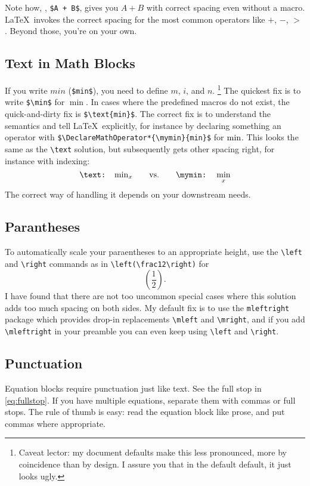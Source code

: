 Note how, \eg, \verb|$A + B$|, gives you $A+B$ with correct spacing even without a macro.
\LaTeX\ invokes the correct spacing for the most common operators like $+$, $-$, $>$ \etc.
Beyond those, you're on your own.

\subsection{Text in Math Blocks}
If you write $min$ (\verb|$min$|), you need to define $m$, $i$, and $n$.%
\footnote{
	Caveat lector: my document defaults make this less pronounced, more by coincidence than by design.
	I assure you that in the default default, it just looks ugly.
}
The quickest fix is to write \verb|$\min$| for $\min$.
In cases where the predefined macros do not exist, the quick-and-dirty fix is \verb|$\text{min}$|.
The correct fix is to understand the semantics and tell \LaTeX\ explicitly, for instance by declaring something an operator with \verb|$\DeclareMathOperator*{\mymin}{min}$| for $\mymin$.
This looks the same as the \verb|\text| solution, but subsequently gets other spacing right, for instance with indexing:
\begin{equation}
	\texttt{\textbackslash text: }\text{min}_x\qquad\text{\vs}\qquad\texttt{\textbackslash mymin: } \mymin_x
\end{equation}
The correct way of handling it depends on your downstream needs.

\subsection{Parantheses}
To automatically scale your paraentheses to an appropriate height, use the \verb|\left| and \verb|\right| commands as in
\verb|\left(\frac12\right)| for
\begin{equation}\label{eq:fullstop}
	\left(\frac12\right).
\end{equation}
I have found that there are not too uncommon special cases where this solution adds too much spacing on both sides.
My default fix is to use the \verb|mleftright| package which provides drop-in replacements \verb|\mleft| and \verb|\mright|, and if you add \verb|\mleftright| in your preamble you can even keep using \verb|\left| and \verb|\right|.

\subsection{Punctuation}
Equation blocks require punctuation just like text.
See the full stop in \cref{eq:fullstop}.
If you have multiple equations, separate them with commas or full stops.
The rule of thumb is easy:
read the equation block like prose, and put commas where appropriate.